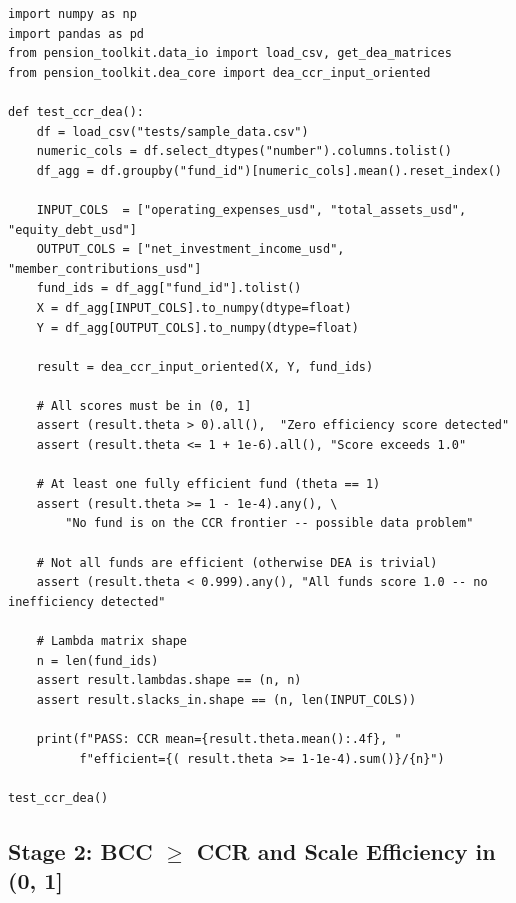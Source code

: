 \documentclass[12pt,a4paper]{article}
\begin{document}
\begin{lstlisting}[style=python, caption={Test: CCR scores are in (0,1] and frontier funds score 1}]
import numpy as np
import pandas as pd
from pension_toolkit.data_io import load_csv, get_dea_matrices
from pension_toolkit.dea_core import dea_ccr_input_oriented

def test_ccr_dea():
    df = load_csv("tests/sample_data.csv")
    numeric_cols = df.select_dtypes("number").columns.tolist()
    df_agg = df.groupby("fund_id")[numeric_cols].mean().reset_index()

    INPUT_COLS  = ["operating_expenses_usd", "total_assets_usd", "equity_debt_usd"]
    OUTPUT_COLS = ["net_investment_income_usd", "member_contributions_usd"]
    fund_ids = df_agg["fund_id"].tolist()
    X = df_agg[INPUT_COLS].to_numpy(dtype=float)
    Y = df_agg[OUTPUT_COLS].to_numpy(dtype=float)

    result = dea_ccr_input_oriented(X, Y, fund_ids)

    # All scores must be in (0, 1]
    assert (result.theta > 0).all(),  "Zero efficiency score detected"
    assert (result.theta <= 1 + 1e-6).all(), "Score exceeds 1.0"

    # At least one fully efficient fund (theta == 1)
    assert (result.theta >= 1 - 1e-4).any(), \
        "No fund is on the CCR frontier -- possible data problem"

    # Not all funds are efficient (otherwise DEA is trivial)
    assert (result.theta < 0.999).any(), "All funds score 1.0 -- no inefficiency detected"

    # Lambda matrix shape
    n = len(fund_ids)
    assert result.lambdas.shape == (n, n)
    assert result.slacks_in.shape == (n, len(INPUT_COLS))

    print(f"PASS: CCR mean={result.theta.mean():.4f}, "
          f"efficient={( result.theta >= 1-1e-4).sum()}/{n}")

test_ccr_dea()
\end{lstlisting}

\subsection{Stage 2: BCC $\geq$ CCR and Scale Efficiency in (0, 1]}
\end{document}
